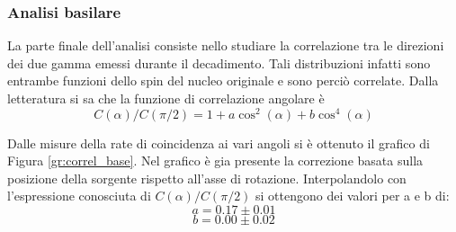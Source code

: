 \subsubsection{Analisi basilare}

La parte finale dell'analisi consiste nello studiare la correlazione tra le direzioni dei due gamma emessi durante il decadimento. Tali distribuzioni infatti sono entrambe funzioni dello spin del nucleo originale e sono perciò correlate. Dalla letteratura si sa che la funzione di correlazione angolare è 
$$ C(\alpha)/C(\pi/2) = 1+a\cos^2(\alpha)+b\cos^4(\alpha)$$

Dalle misure della rate di coincidenza ai vari angoli si è ottenuto il grafico di Figura \ref{gr:correl_base}. Nel grafico è gia presente la correzione basata sulla posizione della sorgente rispetto all'asse di rotazione. Interpolandolo con l'espressione conosciuta di $C(\alpha)/C(\pi/2)$ si ottengono dei valori per a e b di:
$$a=0.17\pm 0.01$$
$$b=0.00\pm 0.02$$


